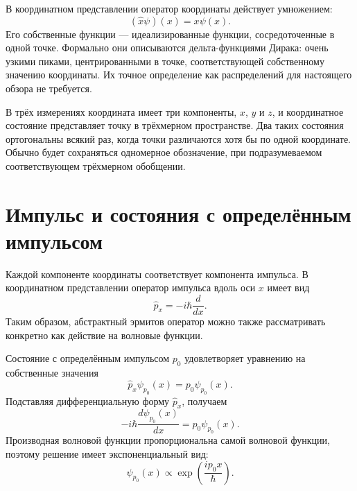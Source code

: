 В координатном представлении оператор координаты действует умножением:
\begin{equation}
(\hat x\psi)(x)=x\psi(x).
\end{equation}
Его собственные функции — идеализированные функции, сосредоточенные в одной точке. Формально они описываются дельта-функциями Дирака: очень узкими пиками, центрированными в точке, соответствующей собственному значению координаты. Их точное определение как распределений для настоящего обзора не требуется.

В трёх измерениях координата имеет три компоненты, \(x\), \(y\) и \(z\), и координатное состояние представляет точку в трёхмерном пространстве. Два таких состояния ортогональны всякий раз, когда точки различаются хотя бы по одной координате. Обычно будет сохраняться одномерное обозначение, при подразумеваемом соответствующем трёхмерном обобщении.

\section{Импульс и состояния с определённым импульсом}

Каждой компоненте координаты соответствует компонента импульса. В координатном представлении оператор импульса вдоль оси \(x\) имеет вид
\begin{equation}
\hat p_x=-i\hbar\frac{d}{dx}.
\end{equation}
Таким образом, абстрактный эрмитов оператор можно также рассматривать конкретно как действие на волновые функции.

Состояние с определённым импульсом \(p_0\) удовлетворяет уравнению на собственные значения
\begin{equation}
\hat p_x\psi_{p_0}(x)=p_0\psi_{p_0}(x).
\end{equation}
Подставляя дифференциальную форму \(\hat p_x\), получаем
\begin{equation}
-i\hbar\frac{d\psi_{p_0}(x)}{dx}
=p_0\psi_{p_0}(x).
\end{equation}
Производная волновой функции пропорциональна самой волновой функции, поэтому решение имеет экспоненциальный вид:
\begin{equation}
\psi_{p_0}(x)\propto
\exp\left(\frac{ip_0x}{\hbar}\right).
\end{equation}

\begin{classroomqa}
\end{classroomqa}

